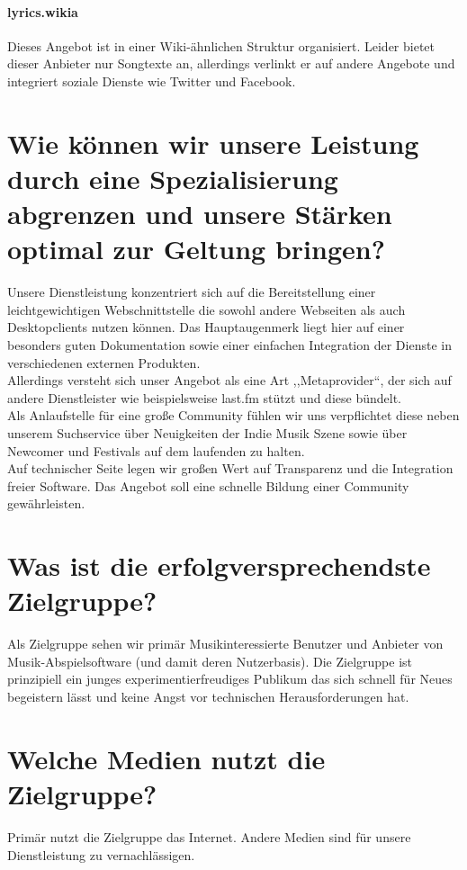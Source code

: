 \paragraph{lyrics.wikia}
Dieses Angebot ist in einer Wiki-ähnlichen Struktur organisiert. Leider bietet
dieser Anbieter nur Songtexte an, allerdings verlinkt er auf andere Angebote und
integriert soziale Dienste wie Twitter und Facebook.

\section{Wie können wir unsere Leistung durch eine Spezialisierung abgrenzen und unsere Stärken optimal zur Geltung bringen?}
Unsere Dienstleistung konzentriert sich auf die Bereitstellung einer
leichtgewichtigen Webschnittstelle die sowohl andere Webseiten als auch
Desktopclients nutzen können. Das Hauptaugenmerk liegt hier auf einer besonders
guten Dokumentation sowie einer einfachen Integration der Dienste in
verschiedenen externen Produkten.
\\
Allerdings versteht sich unser Angebot als eine Art ,,Metaprovider``, der sich
auf andere Dienstleister wie beispielsweise last.fm stützt und diese bündelt.
\\
Als Anlaufstelle für eine große Community fühlen wir uns verpflichtet diese
neben unserem Suchservice über Neuigkeiten der Indie Musik Szene sowie über
Newcomer und Festivals auf dem laufenden zu halten. 
\\
Auf technischer Seite legen wir großen Wert auf Transparenz und die Integration
freier Software. Das Angebot soll eine schnelle Bildung einer Community
gewährleisten.

\section{Was ist die erfolgversprechendste Zielgruppe?}
Als Zielgruppe sehen wir primär Musikinteressierte Benutzer und Anbieter von
Musik-Abspielsoftware (und damit deren Nutzerbasis).
Die Zielgruppe ist prinzipiell ein junges experimentierfreudiges Publikum das
sich schnell für Neues begeistern lässt und keine Angst vor technischen Herausforderungen hat.

\section{Welche Medien nutzt die Zielgruppe?}
Primär nutzt die Zielgruppe das Internet. Andere Medien sind für unsere
Dienstleistung zu vernachlässigen.


